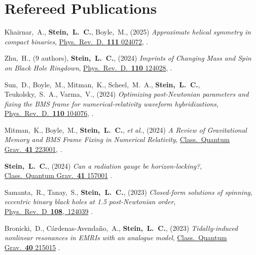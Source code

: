 \section{\sc Refereed Publications}
\addtocounter{pubCounter}{-1}
\begin{etaremune}[start=\value{pubCounter}]
\item
  Khairnar,~A.,
  {\bf Stein,~L.~C.},
  Boyle,~M.,
  (2025)
  {\it Approximate helical symmetry in compact binaries},
  \href{https://doi.org/10.1103/PhysRevD.111.024072}%
  {Phys.~Rev.~D.~{\bf 111} 024072},
  .
\item
  Zhu,~H.,
  (9 authors),
  {\bf Stein,~L.~C.},
  (2024)
  {\it Imprints of Changing Mass and Spin on Black Hole Ringdown},
  \href{https://doi.org/10.1103/PhysRevD.110.124028}%
  {Phys.~Rev.~D.~{\bf 110} 124028},
  .
\item
  Sun,~D.,
  Boyle,~M.,
  Mitman,~K.,
  Scheel,~M.~A.,
  {\bf Stein,~L.~C.},
  Teukolsky,~S.~A.,
  Varma,~V.,
  (2024)
  {\it Optimizing post-Newtonian parameters and fixing the BMS frame for numerical-relativity waveform hybridizations},
  \href{https://doi.org/10.1103/PhysRevD.110.104076}%
  {Phys.~Rev.~D.~{\bf 110} 104076},
  .
\item
  Mitman,~K.,
  Boyle,~M.,
  {\bf Stein,~L.~C.},
  {\it et al.},
  (2024)
  {\it A Review of Gravitational Memory and BMS Frame Fixing in Numerical Relativity},
  \href{https://doi.org/10.1088/1361-6382/ad83c2}%
  {Class.~Quantum Grav.~{\bf 41} 223001},
  .
\item
  {\bf Stein,~L.~C.},
  (2024)
  {\it Can a radiation gauge be horizon-locking?},
  \href{https://doi.org/10.1088/1361-6382/ad563b}%
  {Class.~Quantum Grav.~{\bf 41} 157001}
  .
\item
  Samanta,~R.,
  Tanay,~S.,
  {\bf Stein,~L.~C.},
  (2023)
  {\it Closed-form solutions of spinning, eccentric binary black holes at 1.5 post-Newtonian order},
  \href{https://doi.org/10.1103/PhysRevD.108.124039}%
  {Phys.~Rev.~D~{\bf 108},~124039}
  .
\item
  Bronicki,~D.,
  Cárdenas-Avendaño,~A.,
  {\bf Stein,~L.~C.},
  (2023)
  {\it Tidally-induced nonlinear resonances in EMRIs with an analogue model},
  \href{https://doi.org/10.1088/1361-6382/acfcfe}%
  {Class.~Quantum Grav.~{\bf 40} 215015}
  .
\item

\end{etaremune}
